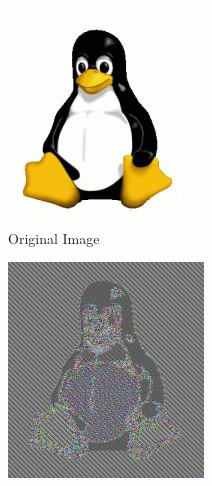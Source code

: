     \begin{figure}[htp!]
        \centering
        \begin{subfigure}[b]{0.3\textwidth}
            \centering
            \includegraphics[width=\textwidth]{img/Tux.jpg}
            \caption{Original Image}
        \end{subfigure}
        \begin{subfigure}[b]{0.3\textwidth}
            \centering
            \includegraphics[width=\textwidth]{img/Tux_ecb.jpg}

\end{subfigure}
\end{figure}

